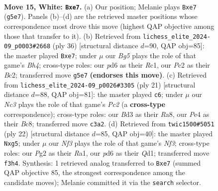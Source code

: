 \documentclass[11pt]{article}
\begin{document}
\clearpage

\begin{figure}[p]\centering
\begin{subfigure}{0.46\textwidth}\centering
\resizebox{\linewidth}{!}{%
\newchessgame
\chessboard[
  setfen={1nbq1rk1/r3bpp1/pp1p4/4p1Bp/PP2P1n1/2NB1N2/2PQ1PPP/R4RK1 w - - 0 15},
  showmover=false,
  pgfstyle=straightmove, color=movearrow, markmove={g5-e7}
]}
\caption{}
\end{subfigure}\hfill
\begin{subfigure}{0.46\textwidth}\centering
\resizebox{\linewidth}{!}{%
\newchessgame
\chessboard[
  setfen={2rqr1k1/1b1nbpp1/pp1p3p/4p2n/PP1PP2B/2NQ1N2/2B2PPP/2R1R1K1 w - - 1 19},
  showmover=false,
  pgfstyle=straightmove, color=movearrow, markmove={h4-e7}
]}
\caption{}
\end{subfigure}
\\[4pt]
\begin{subfigure}{0.46\textwidth}\centering
\resizebox{\linewidth}{!}{%
\newchessgame
\chessboard[
  setfen={r1bq1rk1/2pnbppp/1p2p3/p2nP3/2pP4/2N3P1/PP1NQPBP/R1B2RK1 b - - 2 11},
  showmover=false,
  pgfstyle=straightmove, color=movearrow, markmove={c7-c6}
]}
\caption{}
\end{subfigure}\hfill
\begin{subfigure}{0.46\textwidth}\centering
\resizebox{\linewidth}{!}{%
\newchessgame
\chessboard[
  setfen={r1bq1rk1/ppp1npb1/3p1n1p/3P2p1/7B/2NB1N2/PPP2PPP/R2Q1RK1 w - - 0 12},
  showmover=false,
  pgfstyle=straightmove, color=movearrow, markmove={f3-g5}
]}
\caption{}
\end{subfigure}
\caption{\textbf{Move 15, White: \texttt{Bxe7}.} (a) Our position; Melanie plays \texttt{Bxe7} (\texttt{g5e7}). Panels (b)--(d) are the retrieved master positions whose correspondence most drove this move (highest QAP objective among those that transfer to it). (b) Retrieved from \texttt{lichess\_elite\_2024-09\_p0003\#2668} (ply 36) [structural distance $d$=90, QAP obj=85]: the master played \texttt{Bxe7}; under $\mu$ our \emph{Bg5} plays the role of that game's \emph{Bh4}; cross-type roles: our \emph{p}d6 as their \emph{R}c1, our \emph{P}c2 as their \emph{B}c2; transferred move \texttt{g5e7} \textbf{(endorses this move)}. (c) Retrieved from \texttt{lichess\_elite\_2024-09\_p0026\#3305} (ply 21) [structural distance $d$=88, QAP obj=81]: the master played \texttt{c6}; under $\mu$ our \emph{Nc3} plays the role of that game's \emph{Pc2} (a \textbf{cross-type} correspondence); cross-type roles: our \emph{B}d3 as their \emph{R}a8, our \emph{P}e4 as their \emph{B}c8; transferred move \texttt{c3a2}. (d) Retrieved from \texttt{twic1500\#5051} (ply 22) [structural distance $d$=85, QAP obj=40]: the master played \texttt{Nxg5}; under $\mu$ our \emph{Nf3} plays the role of that game's \emph{Nf3}; cross-type roles: our \emph{P}g2 as their \emph{R}a1, our \emph{p}d6 as their \emph{Q}d1; transferred move \texttt{f3h4}. Synthesis: 1 retrieved analog transferred to \texttt{Bxe7} (summed QAP objective 85, the strongest correspondence among the candidate moves); Melanie committed it via the \texttt{search} selector.}
\label{fig:thought-m28}
\end{figure}
\end{document}
